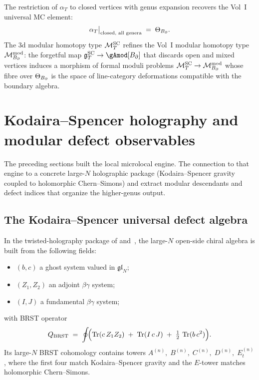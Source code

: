 \begin{corollary}
\label{cor:3d-to-vol1-restriction}
The restriction of $\alpha_T$ to closed vertices with
genus expansion recovers the Vol~I universal MC element:
\[
\alpha_T\big|_{\text{closed, all genera}}
\;=\;
\Theta_{B_{\partial}}.
\]
The 3d modular homotopy type $\mathcal M^{\mathrm{SC}}_T$ refines the
Vol~I modular homotopy type $\mathcal M^{\mathrm{mod}}_{B_{\partial}}$:
the forgetful map $\gSC_T \to \gAmod[\Bbound]$ that discards
open and mixed vertices induces a morphism of formal moduli
problems $\mathcal M^{\mathrm{SC}}_T \to \mathcal M^{\mathrm{mod}}_{B_{\partial}}$
whose fibre over $\Theta_{B_{\partial}}$ is the space of line-category
deformations compatible with the boundary algebra.
\end{corollary}


\section{Kodaira--Spencer holography and modular defect observables}
\label{sec:ks-holography}

The preceding sections built the local microlocal engine.
The connection to that engine to a concrete large-$N$ holographic
package (Kodaira--Spencer gravity coupled to holomorphic
Chern--Simons) and extract modular descendants and defect indices
that organize the higher-genus output.

\subsection{The Kodaira--Spencer universal defect algebra}
\label{subsec:ks-defect-algebra}

\begin{example}
\label{ex:ks-large-n-boundary}
In the twisted-holography package of \cite{Zeng23} and~\cite{KZ25},
the large-$N$ open-side chiral algebra is built from the following
fields:
\begin{itemize}[leftmargin=1.8em]
\item $(b,c)$ a ghost system valued in $\mathfrak{gl}_N$;
\item $(Z_1,Z_2)$ an adjoint $\beta\gamma$ system;
\item $(I,J)$ a fundamental $\beta\gamma$ system;
\end{itemize}
with BRST operator
\[
Q_{\mathrm{BRST}}
\;=\;
\oint\!\Bigl(\operatorname{Tr}(c\,Z_1 Z_2)
 \;+\;\operatorname{Tr}(I\,c\,J)
 \;+\;\tfrac{1}{2}\,\operatorname{Tr}(b\,c^2)\Bigr).
\]
Its large-$N$ BRST cohomology contains towers
$A^{(n)},\;B^{(n)},\;C^{(n)},\;D^{(n)},\;E_t^{(n)}$,
where the first four match Kodaira--Spencer gravity and the
$E$-tower matches holomorphic Chern--Simons.
\end{example}

